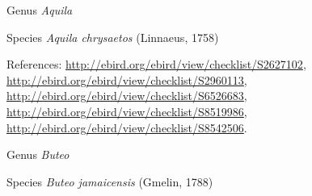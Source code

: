 \documentclass[9pt, article]{memoir}
\begin{document}
\begin{multicols}{2}
\vspace{6pt}\noindent\hspace{30pt}Genus \textit{Aquila}


\vspace{6pt}\noindent\hspace{36pt}Species \textit{Aquila chrysaetos} (Linnaeus, 1758)


\vspace{6pt}References: 
\url{http://ebird.org/ebird/view/checklist/S2627102}, 
\url{http://ebird.org/ebird/view/checklist/S2960113}, 
\url{http://ebird.org/ebird/view/checklist/S6526683}, 
\url{http://ebird.org/ebird/view/checklist/S8519986}, 
\url{http://ebird.org/ebird/view/checklist/S8542506}.

\vspace{6pt}\noindent\hspace{30pt}Genus \textit{Buteo}


\vspace{6pt}\noindent\hspace{36pt}Species \textit{Buteo jamaicensis} (Gmelin, 1788)



\end{multicols}
\end{document}
